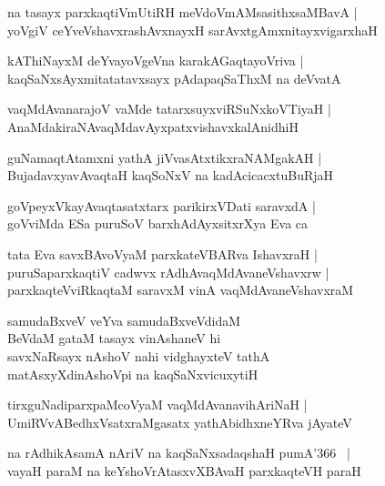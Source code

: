\documentclass[twoside,12pt,openright]{book}
\newcounter{shloka}[chapter]
\begin{document}
\begin{shloka}%
na tasayx parxkaqtiVmUtiRH meVdoVmAMsasithxsaMBavA |\\
yoVgiV ceYveVshavxrashAvxnayxH sarAvxtgAmxnitayxvigarxhaH 
\end{shloka}

\begin{shloka}%
kAThiNayxM deYvayoVgeVna karakAGaqtayoVriva |\\
kaqSaNxsAyxmitatatavxsayx pAdapaqSaThxM na deVvatA 
\end{shloka}

\begin{shloka}%
vaqMdAvanarajoV vaMde tatarxsuyxviRSuNxkoVTiyaH |\\
AnaMdakiraNAvaqMdavAyxpatxvishavxkalAnidhiH
\end{shloka}

\begin{shloka}%
guNamaqtAtamxni yathA jiVvasAtxtikxraNAMgakAH |\\
BujadavxyavAvaqtaH kaqSoNxV na kadAcicacxtuBuRjaH 
\end{shloka}

\begin{shloka}%
goVpeyxVkayAvaqtasatxtarx parikirxVDati saravxdA |\\
goVviMda ESa puruSoV barxhAdAyxsitxrXya Eva ca 
\end{shloka}

\begin{shloka}%
tata Eva savxBAvoVyaM parxkateVBARva IshavxraH |\\
puruSaparxkaqtiV cadwvx rAdhAvaqMdAvaneVshavxrw |\\
parxkaqteVviRkaqtaM saravxM vinA vaqMdAvaneVshavxraM 
\end{shloka}

\begin{shloka}%
samudaBxveV veYva samudaBxveVdidaM \\
BeVdaM gataM tasayx vinAshaneV hi \\
savxNaRsayx nAshoV nahi vidghayxteV tathA \\
matAsxyXdinAshoVpi na kaqSaNxvicuxytiH 
\end{shloka}

\begin{shloka}%
tirxguNadiparxpaMcoVyaM vaqMdAvanavihAriNaH |\\
UmiRVvABedhxVsatxraMgasatx yathAbidhxneYRva jAyateV 
\end{shloka}

\begin{shloka}%
na rAdhikAsamA nAriV na kaqSaNxsadaqshaH pumA\char'366 ~|\\
vayaH paraM na keYshoVrAtasxvXBAvaH parxkaqteVH paraH 
\end{shloka}
\end{document}
